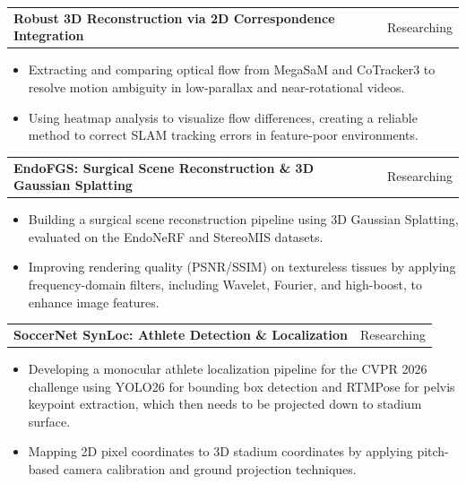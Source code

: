 \documentclass[letterpaper,11pt]{article}
\makeatletter
\newcommand{\resumeItem}[1]{
  \item\small{
    {#1 \vspace{-2pt}}
  }
}
\newcommand{\resumeSubheadTwo}[2]{
  \vspace{-1pt}\item
    \begin{tabular*}{0.97\textwidth}{l@{\extracolsep{\fill}}r}
      \textbf{#1} & #2
    \end{tabular*}\vspace{-5pt}
}
\newcommand{\resumeItemListStart}{\begin{itemize}}
\newcommand{\resumeItemListEnd}{\end{itemize}\vspace{-5pt}}
\makeatother
\begin{document}
        \resumeSubheadTwo{Robust 3D Reconstruction via 2D Correspondence Integration}{Researching}
            \resumeItemListStart
                \resumeItem{Extracting and comparing optical flow from MegaSaM and CoTracker3 to resolve motion ambiguity in low-parallax and near-rotational videos.}
                \resumeItem{Using heatmap analysis to visualize flow differences, creating a reliable method to correct SLAM tracking errors in feature-poor environments.}
            \resumeItemListEnd
    
        \resumeSubheadTwo{EndoFGS: Surgical Scene Reconstruction \& 3D Gaussian Splatting}{Researching}
            \resumeItemListStart
                \resumeItem{Building a surgical scene reconstruction pipeline using 3D Gaussian Splatting, evaluated on the EndoNeRF and StereoMIS datasets.}
                \resumeItem{Improving rendering quality (PSNR/SSIM) on textureless tissues by applying frequency-domain filters, including Wavelet, Fourier, and high-boost, to enhance image features.}
            \resumeItemListEnd
        
        \resumeSubheadTwo{SoccerNet SynLoc: Athlete Detection \& Localization}{Researching}
            \resumeItemListStart
                \resumeItem{Developing a monocular athlete localization pipeline for the CVPR 2026 challenge using YOLO26 for bounding box detection and RTMPose for pelvis keypoint extraction, which then needs to be projected down to stadium surface.}
                \resumeItem{Mapping 2D pixel coordinates to 3D stadium coordinates by applying pitch-based camera calibration and ground projection techniques.}
            \resumeItemListEnd

            
    
\end{document}
